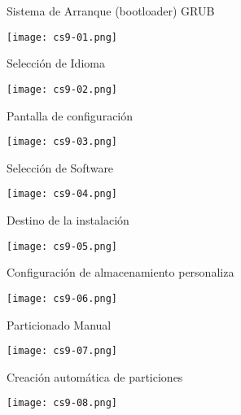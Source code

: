 \begin{frame}[c]{Sistema de Arranque (bootloader) GRUB}
  \begin{center}
    \texttt{[image: cs9-01.png]}
  \end{center}
\end{frame}

\begin{frame}[c]{Selección de Idioma}
  \begin{center}
    \texttt{[image: cs9-02.png]}
  \end{center}
\end{frame}

\begin{frame}[c]{Pantalla de configuración}
  \begin{center}
    \texttt{[image: cs9-03.png]}
  \end{center}
\end{frame}

\begin{frame}[c]{Selección de Software}
  \begin{center}
    \texttt{[image: cs9-04.png]}
  \end{center}
\end{frame}

\begin{frame}[c]{Destino de la instalación}
  \begin{center}
    \texttt{[image: cs9-05.png]}
  \end{center}
\end{frame}

\begin{frame}[c]{Configuración de almacenamiento personaliza}
  \begin{center}
    \texttt{[image: cs9-06.png]}
  \end{center}
\end{frame}

\begin{frame}[c]{Particionado Manual}
  \begin{center}
    \texttt{[image: cs9-07.png]}
  \end{center}
\end{frame}

\begin{frame}[c]{Creación automática de particiones}
  \begin{center}
    \texttt{[image: cs9-08.png]}
  \end{center}
\end{frame}

